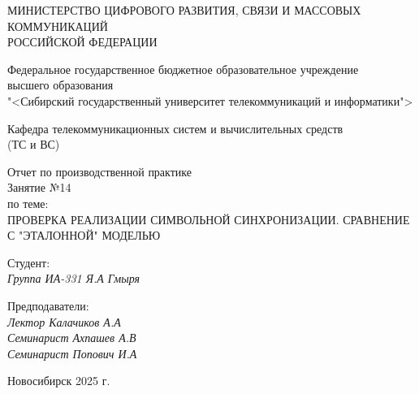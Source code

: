 \thispagestyle{empty}

\begin{center}
    МИНИСТЕРСТВО ЦИФРОВОГО РАЗВИТИЯ, СВЯЗИ И МАССОВЫХ КОММУНИКАЦИЙ \\ РОССИЙСКОЙ ФЕДЕРАЦИИ

    \vspace{20pt}

    Федеральное государственное бюджетное образовательное учреждение  \\  высшего образования \\
    "<Сибирский государственный университет телекоммуникаций и информатики"> \\

    \vspace{20pt}

    Кафедра телекоммуникационных систем и вычислительных средств \\  (ТС и ВС)
\end{center}

\vfill

\begin{center}
    Отчет по производственной практике \\  
    Занятие №14 \\

    \vspace{20pt}
    по теме: \\
    \uppercase{Проверка реализации символьной синхронизации. Сравнение с "эталонной" моделью}
\end{center}

\vfill

    \noindent Студент: \\
    \textit{Группа ИА-331 \hfill Я.А Гмыря}

    \vspace{20pt}

    \noindent Предподаватели: \\
    \textit{Лектор \hfill Калачиков А.А} \\
    \textit{Семинарист \hfill Ахпашев А.В} \\
    \textit{Семинарист \hfill Попович И.А}

\vfill

\begin{center}
    Новосибирск 2025 г.
\end{center}